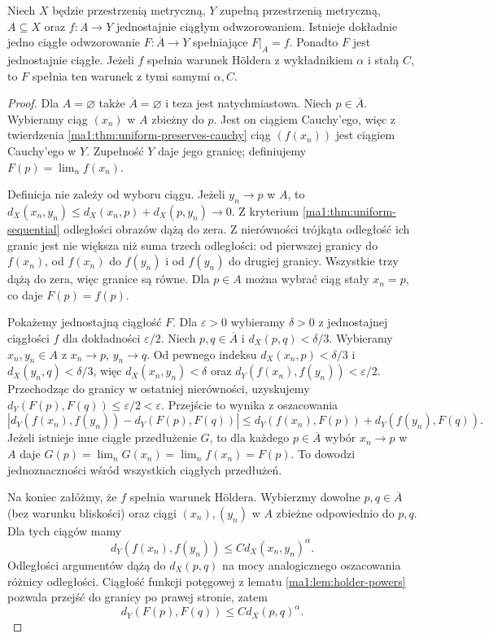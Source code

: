 \begin{twierdzenie}
\label{ma1:thm:uniform-extension}
Niech $X$ będzie przestrzenią metryczną, $Y$ zupełną przestrzenią metryczną, $A\subseteq X$ oraz $f:A\to Y$ jednostajnie ciągłym odwzorowaniem. Istnieje dokładnie jedno ciągłe odwzorowanie $F:\overline A\to Y$ spełniające $F|_A=f$. Ponadto $F$ jest jednostajnie ciągłe. Jeżeli $f$ spełnia warunek H\"oldera z wykładnikiem $\alpha$ i stałą $C$, to $F$ spełnia ten warunek z tymi samymi $\alpha,C$.
\end{twierdzenie}
\begin{proof}
Dla $A=\varnothing$ także $\overline A=\varnothing$ i teza jest natychmiastowa. Niech $p\in\overline A$. Wybieramy ciąg $(x_n)$ w $A$ zbieżny do $p$. Jest on ciągiem Cauchy'ego, więc z twierdzenia \ref{ma1:thm:uniform-preserves-cauchy} ciąg $(f(x_n))$ jest ciągiem Cauchy'ego w $Y$. Zupełność $Y$ daje jego granicę; definiujemy $F(p)=\lim_n f(x_n)$.

Definicja nie zależy od wyboru ciągu. Jeżeli $y_n\to p$ w $A$, to $d_X(x_n,y_n)\le d_X(x_n,p)+d_X(p,y_n)\to0$. Z kryterium \ref{ma1:thm:uniform-sequential} odległości obrazów dążą do zera. Z nierówności trójkąta odległość ich granic jest nie większa niż suma trzech odległości: od pierwszej granicy do $f(x_n)$, od $f(x_n)$ do $f(y_n)$ i od $f(y_n)$ do drugiej granicy. Wszystkie trzy dążą do zera, więc granice są równe. Dla $p\in A$ można wybrać ciąg stały $x_n=p$, co daje $F(p)=f(p)$.

Pokażemy jednostajną ciągłość $F$. Dla $\varepsilon>0$ wybieramy $\delta>0$ z jednostajnej ciągłości $f$ dla dokładności $\varepsilon/2$. Niech $p,q\in\overline A$ i $d_X(p,q)<\delta/3$. Wybieramy $x_n,y_n\in A$ z $x_n\to p$, $y_n\to q$. Od pewnego indeksu $d_X(x_n,p)<\delta/3$ i $d_X(y_n,q)<\delta/3$, więc $d_X(x_n,y_n)<\delta$ oraz $d_Y(f(x_n),f(y_n))<\varepsilon/2$. Przechodząc do granicy w ostatniej nierówności, uzyskujemy $d_Y(F(p),F(q))\le\varepsilon/2<\varepsilon$. Przejście to wynika z oszacowania
\[
 |d_Y(f(x_n),f(y_n))-d_Y(F(p),F(q))|
 \le d_Y(f(x_n),F(p))+d_Y(f(y_n),F(q)).
\]
Jeżeli istnieje inne ciągłe przedłużenie $G$, to dla każdego $p\in\overline A$ wybór $x_n\to p$ w $A$ daje $G(p)=\lim_n G(x_n)=\lim_n f(x_n)=F(p)$. To dowodzi jednoznaczności wśród wszystkich ciągłych przedłużeń.

Na koniec załóżmy, że $f$ spełnia warunek H\"oldera. Wybierzmy dowolne $p,q\in\overline A$ (bez warunku bliskości) oraz ciągi $(x_n),(y_n)$ w $A$ zbieżne odpowiednio do $p,q$. Dla tych ciągów mamy
\[
 d_Y(f(x_n),f(y_n))\le C d_X(x_n,y_n)^\alpha.
\]
Odległości argumentów dążą do $d_X(p,q)$ na mocy analogicznego oszacowania różnicy odległości. Ciągłość funkcji potęgowej z lematu \ref{ma1:lem:holder-powers} pozwala przejść do granicy po prawej stronie, zatem
\[
 d_Y(F(p),F(q))\le C d_X(p,q)^\alpha.
\]
\end{proof}

